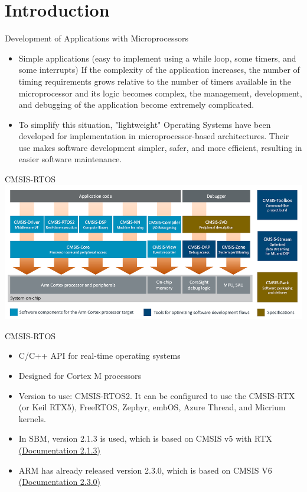 \section{Introduction}

\begin{frame}{Development of Applications with Microprocessors}
    \begin{itemize}
        \item Simple applications (easy to implement using a while loop, some timers, and some interrupts)
If the complexity of the application increases, the number of timing requirements grows relative to the number of timers available in the microprocessor and its logic becomes complex, the management, development, and debugging of the application become extremely complicated.
        \item To simplify this situation, "lightweight" Operating Systems have been developed for implementation in microprocessor-based architectures. Their use makes software development simpler, safer, and more efficient, resulting in easier software maintenance.
    \end{itemize}
     \centering

\end{frame}

\begin{frame}{CMSIS-RTOS}
    \includegraphics[scale=0.35]{presentation/cmsis_components.png}
\end{frame}

\begin{frame}{CMSIS-RTOS}
    \begin{itemize}
      \item C/C++ API for real-time operating systems
      \item Designed for Cortex M processors
      \item Version to use: CMSIS-RTOS2. It can be configured to use the CMSIS-RTX (or Keil RTX5), FreeRTOS, Zephyr, embOS, Azure Thread, and Micrium kernels.
      \item In SBM, version 2.1.3 is used, which is based on CMSIS v5 with RTX \href{https://arm-software.github.io/CMSIS_5/RTOS2/html/index.html}{(Documentation 2.1.3)}
      \item ARM has already released version 2.3.0, which is based on CMSIS V6 \href{https://arm-software.github.io/CMSIS_6/latest/RTOS2/index.html}{(Documentation 2.3.0)}
    \end{itemize}

\end{frame}
